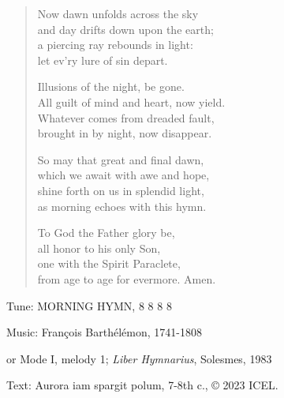 \hymn

\begin{verse}
Now dawn unfolds across the sky\\
and day drifts down upon the earth;\\
a piercing ray rebounds in light:\\
let ev’ry lure of sin depart.

Illusions of the night, be gone.\\
All guilt of mind and heart, now yield.\\
Whatever comes from dreaded fault,\\
brought in by night, now disappear.

So may that great and final dawn,\\
which we await with awe and hope,\\
shine forth on us in splendid light,\\
as morning echoes with this hymn.

To God the Father glory be,\\
all honor to his only Son,\\
one with the Spirit Paraclete,\\
from age to age for evermore. Amen.
\end{verse}

\begin{hymnsource}
Tune: MORNING HYMN, 8 8 8 8

Music: François Barthélémon, 1741-1808

or Mode I, melody 1; \emph{Liber Hymnarius}, Solesmes, 1983

Text: Aurora iam spargit polum, 7-8th c., © 2023 ICEL.
\end{hymnsource}